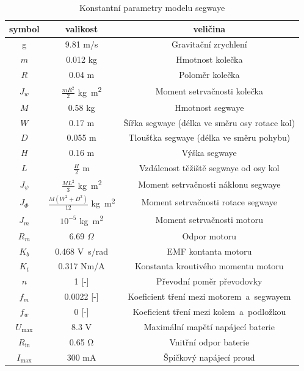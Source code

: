 \documentclass[conference]{IEEEtran}
\begin{document}
\begin{table}[htbp]
    \centering
    \begin{tabular}[t]{|c|c|c|}
        \hline
        symbol & valikost & veličina \\\hline
        g  & 9.81 \si{m/s} & Gravitační zrychlení \\\hline
        $ m $ & 0.012 \si{kg} & Hmotnost kolečka \\\hline
        $ R $ & 0.04 \si{m }& Poloměr kolečka \\\hline
        $ J_w $ & $\frac{mR^2}{2}$ \si{kg . m^2} & Moment setrvačnosti kolečka \\\hline
        $ M $ & 0.58   \si{kg} & Hmotnost segwaye \\\hline
        $ W $ & 0.17  \si{ m} & Šířka segwaye (délka ve směru osy rotace kol) \\\hline
        $ D $ & 0.055  \si{ m} & Tloušťka segwaye (délka ve směru pohybu) \\\hline
        $ H $ & 0.16 \si{m }& Výška  segwaye \\\hline
        $ L $ & $\frac{H}{2}$ \si{m} & Vzdálenost těžiště segwaye od osy kol \\\hline
        $ J_\psi $ & $\frac{ML^2}{3}$ \si{kg . m^2} & Moment setrvačnosti náklonu segwaye\\\hline
        $ J_\varPhi $ & $\frac{M(W^2 + D^2)}{12}$ \si{kg . m^2} & Moment setrvačnosti rotace segwaye \\\hline
        $ J_m $ & $10^{-5}$ \si{kg . m^2} & Moment setrvačnosti motoru \\\hline
        $ R_m $ & 6.69 $\Omega$ & Odpor motoru \\\hline
        $ K_b $ & 0.468 \si{V.s/rad} & EMF kontanta motoru \\\hline
        $ K_t $ & 0.317 \si{Nm/A} & Konstanta kroutivého momentu motoru \\\hline
        $ n $ & 1 [-] & Převodní poměr převodovky \\\hline
        $ f_m $ & 0.0022 [-] & Koeficient tření mezi motorem~a~segwayem \\\hline
        $ f_w $ & 0 [-] & Koeficient tření mezi kolem~a~podložkou \\\hline
        $ U_\text{max} $ & 8.3 \si{V} & Maximální mapětí napájecí baterie \\\hline
        $ R_\text{in} $ & 0.65 \si{\ohm} & Vnitřní odpor baterie \\\hline
        $ I_\text{max} $ & 300 \si{\milli\ampere} & Špičkový napájecí proud \\\hline
        
    \end{tabular}
    \caption{Konstantní parametry modelu segwaye}
    \label{tab:konstanty}
\end{table}
\end{document}
